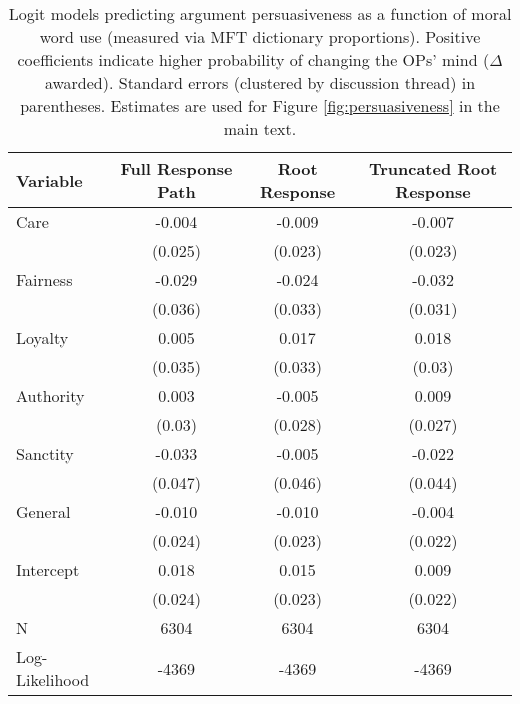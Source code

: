 \begin{table}[ht]
\centering
\caption[Logit models predicting argument persuasiveness as a 
            function of moral word use]{Logit models predicting argument persuasiveness as a 
            function of moral word use (measured via MFT dictionary proportions). 
            Positive coefficients indicate higher probability of changing the OPs'
            mind ($\Delta$ awarded). 
            Standard errors (clustered by discussion thread) in parentheses. Estimates are used for Figure
            \ref{fig:persuasiveness} in the main text.} 
\label{tab:persuasiveness}
\begin{tabular}{lccc}
  \hline
Variable & Full Response Path & Root Response & Truncated Root Response \\ 
  \hline
Care & -0.004 & -0.009 & -0.007 \\ 
   & (0.025) & (0.023) & (0.023) \\ 
  Fairness & -0.029 & -0.024 & -0.032 \\ 
   & (0.036) & (0.033) & (0.031) \\ 
  Loyalty &  0.005 &  0.017 &  0.018 \\ 
   & (0.035) & (0.033) & (0.03) \\ 
  Authority &  0.003 & -0.005 &  0.009 \\ 
   & (0.03) & (0.028) & (0.027) \\ 
  Sanctity & -0.033 & -0.005 & -0.022 \\ 
   & (0.047) & (0.046) & (0.044) \\ 
  General & -0.010 & -0.010 & -0.004 \\ 
   & (0.024) & (0.023) & (0.022) \\ 
  Intercept &  0.018 &  0.015 &  0.009 \\ 
   & (0.024) & (0.023) & (0.022) \\ 
   \hline
N & 6304 & 6304 & 6304 \\ 
  Log-Likelihood & -4369 & -4369 & -4369 \\ 
   \hline
\end{tabular}
\end{table}
